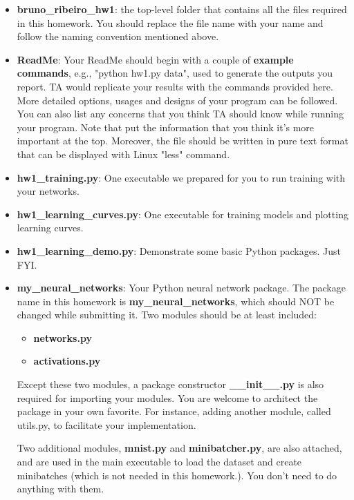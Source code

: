 \documentclass{article}
\newcommand{\homeworknumber}{1}
\begin{document}
\begin{itemize}
\item \textbf{bruno\_ribeiro\_hw\homeworknumber}: the top-level folder that contains all the files
          required in this homework. You should replace the file name with your
          name and follow the naming convention mentioned above.

\item \textbf{ReadMe}: Your ReadMe should begin with a couple of \textbf{example commands}, e.g., "python hw\homeworknumber.py data", used to generate the outputs you report. TA would replicate your results with the commands
          provided here. More detailed options, usages and designs of your
          program can be followed. You can also list any concerns that you
          think TA should know while running your program. Note that put the
          information that you think it's more important at the top. Moreover,
          the file should be written in pure text format that can be displayed
          with Linux "less" command.

\item \textbf{hw\homeworknumber\_training.py}: One executable we prepared for you to run
          training with your networks.

\item \textbf{hw\homeworknumber\_learning\_curves.py}: One executable for training models
          and plotting learning curves.

\item \textbf{hw\homeworknumber\_learning\_demo.py}: Demonstrate some basic Python packages. Just FYI.

\item \textbf{my\_neural\_networks}: Your Python neural network package.
          The package name in this homework is \textbf{my\_neural\_networks},
          which should NOT be changed while submitting it. Two modules should
          be at least included:
\begin{itemize}
\item \textbf{networks.py}
\item \textbf{activations.py}
\end{itemize}
Except these two modules, a package constructor \textbf{\_\_init\_\_.py} is also required for importing your modules. You are welcome to architect the package in your own favorite. For instance, adding another module, called utils.py, to facilitate your implementation.

Two additional modules, \textbf{mnist.py} and \textbf{minibatcher.py}, are also attached, and are used in the main executable to load the dataset and create minibatches (which is not needed in this homework.). You don't need to do anything with them.

\end{itemize}
\end{document}
